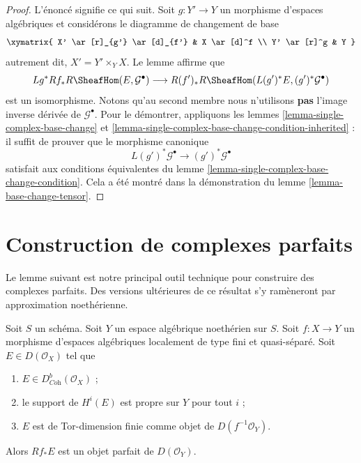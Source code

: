 \begin{proof}
L'énoncé signifie ce qui suit. Soit $g : Y' \to Y$ un morphisme d'espaces
algébriques et considérons le diagramme de changement de base
$$
\xymatrix{
X' \ar[r]_{g'} \ar[d]_{f'} &
X \ar[d]^f \\
Y' \ar[r]^g &
Y
}
$$
autrement dit, $X' = Y' \times_Y X$. Le lemme affirme que
$$
Lg^*Rf_*R\SheafHom(E, \mathcal{G}^\bullet)
\longrightarrow
R(f')_*R\SheafHom(L(g')^*E, (g')^*\mathcal{G}^\bullet)
$$
est un isomorphisme. Notons qu'au second membre nous n'utilisons {\bf pas}
l'image inverse dérivée de $\mathcal{G}^\bullet$. Pour le démontrer, appliquons les
lemmes \ref{lemma-single-complex-base-change} et
\ref{lemma-single-complex-base-change-condition-inherited} : il
suffit de prouver que le morphisme canonique
$$
L(g')^*\mathcal{G}^\bullet \to (g')^*\mathcal{G}^\bullet
$$
satisfait aux conditions équivalentes du
lemme \ref{lemma-single-complex-base-change-condition}.
Cela a été montré dans la démonstration du lemme \ref{lemma-base-change-tensor}.
\end{proof}

\section{Construction de complexes parfaits}
\label{section-producing-perfect}

\noindent
Le lemme suivant est notre principal outil technique pour construire des
complexes parfaits. Des versions ult\'erieures de ce r\'esultat s'y ram\`eneront
par approximation noeth\'erienne.

\begin{lemma}
\label{lemma-perfect-direct-image}
Soit $S$ un sch\'ema. Soit $Y$ un espace alg\'ebrique noeth\'erien sur $S$.
Soit $f:X\to Y$ un morphisme d'espaces alg\'ebriques localement de type fini
et quasi-s\'epar\'e. Soit $E\in D(\mathcal{O}_X)$ tel que
\begin{enumerate}
\item $E\in D^b_{\textit{Coh}}(\mathcal{O}_X)$ ;
\item le support de $H^i(E)$ est propre sur $Y$ pour tout $i$ ;
\item $E$ est de Tor-dimension finie comme objet de
$D(f^{-1}\mathcal{O}_Y)$.
\end{enumerate}
Alors $Rf_*E$ est un objet parfait de $D(\mathcal{O}_Y)$.
\end{lemma}

